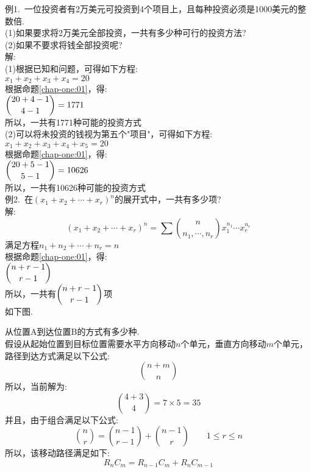 例1.\ 一位投资者有2万美元可投资到4个项目上，且每种投资必须是1000美元的整数倍.\\
(1)如果要求将2万美元全部投资，一共有多少种可行的投资方法?\\
(2)如果不要求将钱全部投资呢?\\
解:\\
(1)根据已知和问题，可得如下方程:\\
$x_1+x_2+x_3+x_4=20$\\
根据命题\ref{chap-one:01}，得:\\[1ex]
$\dbinom{20+4-1}{4-1}=1771$\\
所以，一共有1771种可能的投资方式\\
(2)可以将未投资的钱视为第五个"项目"，可得如下方程:\\
$x_1+x_2+x_3+x_4+x_5=20$\\
根据命题\ref{chap-one:01}，得:\\[1ex]
$\dbinom{20+5-1}{5-1}=10626$\\
所以，一共有10626种可能的投资方式\\[1ex]

例2.\ 在$(x_1+x_2+\cdots+x_r)^n$的展开式中，一共有多少项?\\
解:
\[(x_1+x_2+\cdots+x_r)^n=\sum\binom{n}{n_1,\cdots,n_r}x_1^{n_1}\cdots x_r^{n_r}\]
满足方程$n_1+n_2+\cdots+n_r=n$\\
根据命题\ref{chap-one:01}，得:\\[1ex]
$\dbinom{n+r-1}{r-1}$\\
所以，一共有$\dbinom{n+r-1}{r-1}$项\\[2ex]

如下图.\\
从位置A到达位置B的方式有多少种.\\
假设从起始位置到目标位置需要水平方向移动$n$个单元，垂直方向移动$m$个单元，路径到达方式满足以下公式:
\[\binom{n+m}{n}\]
所以，当前解为:\\
\[\binom{4+3}{4}=7\times 5=35\]
并且，由于组合满足以下公式:\\
\[\binom{n}{r}=\binom{n-1}{r-1}+\binom{n-1}{r}\qquad 1\leqslant r\leqslant n\]
所以，该移动路径满足如下:\\
\[R_nC_m=R_{n-1}C_m+R_nC_{m-1}\]
